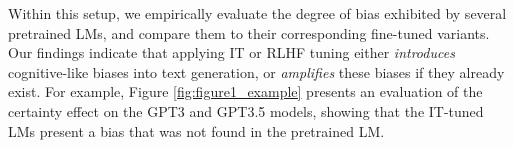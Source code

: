 
Within this setup, we empirically evaluate the degree of bias exhibited by several pretrained LMs, and compare them to their corresponding fine-tuned variants.
Our findings indicate that applying IT or RLHF tuning either
\emph{introduces} cognitive-like biases into text generation,
or \emph{amplifies} these biases if they already exist.
For example, Figure \ref{fig:figure1_example} presents 
an evaluation of the certainty effect on the GPT3 and GPT3.5 models,
showing that the IT-tuned LMs present a bias that was not found in the pretrained LM.


